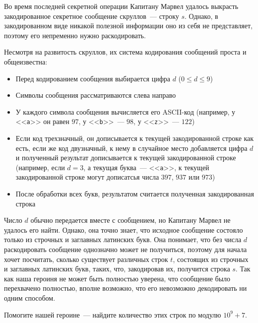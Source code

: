 Во время последней секретной операции Капитану Марвел удалось выкрасть закодированное секретное сообщение скруллов~--- строку $s$. Однако, в закодированном виде никакой полезной информации оно из себя не представляет, поэтому его непременно нужно раскодировать.

Несмотря на развитость скруллов, их система кодирования сообщений проста и общеизвестна: \begin{itemize}
\item Перед кодированием сообщения выбирается цифра $d$ ($0 \le d \le 9$)
\item Символы сообщения рассматриваются слева направо
\item У каждого символа сообщения вычисляется его ASCII-код (например, у <<\texttt{a}>> он равен $97$, у <<\texttt{b}>>~--- $98$, у <<\texttt{z}>>~--- $122$)
\item Если код трехзначный, он дописывается к текущей закодированной строке как есть, если же код двузначный, к нему в случайное место добавляется цифра $d$ и полученный результат дописывается к текущей закодированной строке (например, если $d = 3$, а текущая буква~--- <<\texttt{a}>>, к текущей закодированной строке могут дописатсья числа $397$, $937$ или $973$)
\item После обработки всех букв, результатом считается полученная закодированная строка
\end{itemize}

Число $d$ обычно передается вместе с сообщением, но Капитану Марвел не удалось его найти. Однако, она точно знает, что исходное сообщение состояло только из строчных и заглавных латинских букв. Она понимает, что без числа $d$ раскодировать сообщение однозначно может не получиться, поэтому для начала хочет посчитать, сколько существует различных строк $t$, состоящих из строчных и заглавных латинских букв, таких, что, закодировав их, получится строка $s$. Так как наша героиня не может быть полностью уверена, что сообщение было перехвачено полностью, вполне возможно, что его невозможно декодировать ни одним способом.

Помогите нашей героине~--- найдите количество этих строк по модулю $10^9 + 7$.
